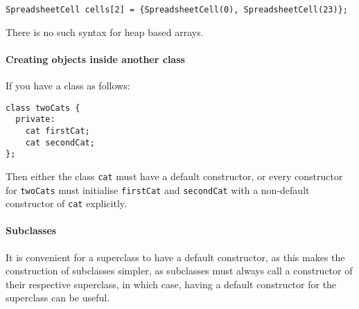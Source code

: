 \documentclass[a4paper,12pt]{article}
\begin{document}
\begin{lstlisting}[caption={Example of \emph{initialisers}}]
SpreadsheetCell cells[2] = {SpreadsheetCell(0), SpreadsheetCell(23)};
\end{lstlisting}

There is no such syntax for heap based arrays.

\paragraph{Creating objects inside another class}
If you have a class as follows:

\begin{lstlisting}
class twoCats {
  private:
    cat firstCat;
    cat secondCat;
};
\end{lstlisting}
Then either the class \lstinline|cat| must have a default constructor, or every constructor for \lstinline|twoCats| must initialise \lstinline|firstCat| and \lstinline|secondCat| with a non-default constructor of \lstinline|cat| explicitly.

\paragraph{Subclasses}
It is convenient for a superclass to have a default constructor, as this makes the construction of subclasses simpler, as subclasses must always call a constructor of their respective superclass, in which case, having a default constructor for the superclass can be useful.
\end{document}
